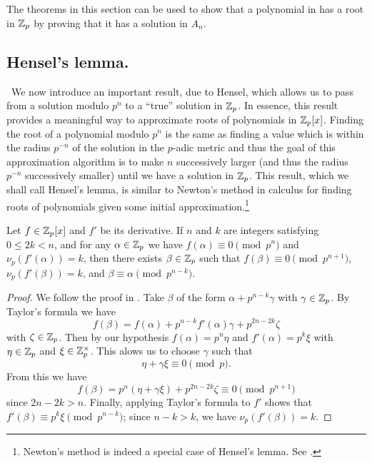 The theorems in this section can be used to show that a polynomial in has a root
in \(\mathbb{Z}_p\) by proving that it has a solution in \(A_n\).
\cite{weismann2006annotations}

\subsection{Hensel's lemma.}~We now introduce an important result, due to
Hensel, which allows us to pass from a solution modulo \(p^n\) to a ``true''
solution in \(\mathbb{Z}_p\). In essence, this result provides a meaningful way
to approximate roots of polynomials in \(\mathbb{Z}_p[x]\). Finding the root of a
polynomial modulo \(p^n\) is the same as finding a value which is within the
radius \(p^{-n}\) of the solution in the \(p\)-adic metric
\cite{weismann2006annotations} and thus the goal of this approximation algorithm
is to make \(n\) successively larger (and thus the radius \(p^{-n}\)
successively smaller) until we have a solution in \(\mathbb{Z}_p\). This result,
which we shall call Hensel's lemma, is similar to Newton's method in calculus
for finding roots of polynomials given some initial
approximation.\footnote{Newton's method is indeed a special case of Hensel's
lemma. See \cite{von1984hensel}.}

\begin{lemma}
    Let \(f \in \mathbb{Z}_p[x]\) and \(f'\) be its derivative. If \(n\) and
    \(k\) are integers satisfying \(0 \leq 2k < n\), and for any \(\alpha \in
    \mathbb{Z}_p\) we have \(f(\alpha) \equiv 0 \pmod{p^n}\) and
    \(\nu_p(f'(\alpha)) = k\), then there exists \(\beta \in \mathbb{Z}_p\) such
    that \(f(\beta) \equiv 0 \pmod{p^{n + 1}}\), \(\nu_p(f'(\beta)) = k\), and
    \(\beta \equiv \alpha \pmod{p^{n-k}}\).
\end{lemma}

\begin{proof}
    We follow the proof in \cite{serre2012course}. Take \(\beta\) of the form
    \(\alpha + p^{n-k}\gamma\) with \(\gamma \in \mathbb{Z}_p\). By Taylor's
    formula we have
    \[
        f(\beta) = f(\alpha) + p^{n-k}f'(\alpha)\gamma + p^{2n-2k}\zeta
    \]
    with \(\zeta \in \mathbb{Z}_p\). Then by our hypothesis \(f(\alpha) =
    p^n\eta\) and \(f'(\alpha) = p^k\xi\) with \(\eta \in \mathbb{Z}_p\) and
    \(\xi \in \mathbb{Z}_p^{\times}\). This alows us to choose \(\gamma\) such that
    \[
        \eta + \gamma\xi \equiv 0 \pmod{p}.
    \]
    From this we have
    \[
        f(\beta) = p^n(\eta + \gamma\xi) + p^{2n-2k}\zeta \equiv 0 \pmod{p^{n+1}}
    \]
    since \(2n - 2k > n\). Finally, applying Taylor's formula to \(f'\) shows
    that \(f'(\beta) \equiv p^k \xi \pmod{p^{n-k}}\); since \(n - k > k\), we
    have \(\nu_p(f'(\beta)) = k\).
\end{proof}

